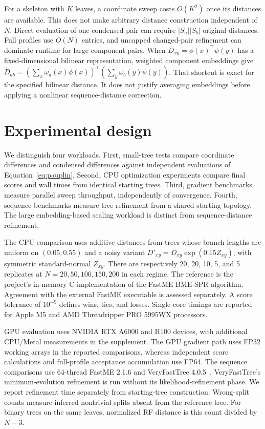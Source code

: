 \documentclass[11pt,a4paper]{article}
\makeatletter
\DeclareRobustCommand{\_}{\ifmmode\nfss@text{\textunderscore}\else\textunderscore\allowbreak\fi}
\theoremstyle{definition}
\makeatother
\begin{document}
For a skeleton with $K$ leaves, a coordinate sweep costs $O(K^2)$ once its distances are available.
This does not make arbitrary distance construction independent of $N$.
Direct evaluation of one condensed pair can require $|S_a||S_b|$ original distances.
Full profiles use $O(N)$ entries, and uncapped changed-pair refinement can dominate runtime for large component pairs.
When $D_{xy}=\phi(x)^\top\psi(y)$ has a fixed-dimensional bilinear representation, weighted component embeddings give
$\widetilde D_{ab}=(\sum_x\omega_a(x)\phi(x))^\top
(\sum_y\omega_b(y)\psi(y))$.
That shortcut is exact for the specified bilinear distance.
It does not justify averaging embeddings before applying a nonlinear sequence-distance correction.

\section{Experimental design}
\label{sec:experiments}

We distinguish four workloads.
First, small-tree tests compare coordinate differences and condensed differences against independent evaluations of Equation~\eqref{eq:pauplin}.
Second, CPU optimization experiments compare final scores and wall times from identical starting trees.
Third, gradient benchmarks measure parallel sweep throughput, independently of convergence.
Fourth, sequence benchmarks measure tree refinement from a shared starting topology.
The large embedding-based scaling workload is distinct from sequence-distance refinement.

The CPU comparison uses additive distances from trees whose branch lengths are uniform on $(0.05,0.55)$ and a noisy variant
$D'_{xy}=D_{xy}\exp(0.15Z_{xy})$, with symmetric standard-normal $Z_{xy}$.
There are respectively 20, 20, 10, 5, and 5 replicates at
$N=20,50,100,150,200$ in each regime.
The reference is the project's in-memory C implementation of the FastME BME-SPR algorithm.
Agreement with the external FastME executable is assessed separately.
A score tolerance of $10^{-9}$ defines wins, ties, and losses.
Single-core timings are reported for Apple M5 and AMD Threadripper PRO 5995WX processors.

GPU evaluation uses NVIDIA RTX A6000 and H100 devices, with additional CPU/Metal measurements in the supplement.
The GPU gradient path uses FP32 working arrays in the reported comparisons, whereas independent score calculations and full-profile acceptance accumulation use FP64.
The sequence comparisons use 64-thread FastME 2.1.6 and VeryFastTree 4.0.5~\cite{lefort2015fastme,pineiro2020veryfasttree}.
VeryFastTree's minimum-evolution refinement is run without its likelihood-refinement phase.
We report refinement time separately from starting-tree construction.
Wrong-split counts measure inferred nontrivial splits absent from the reference tree.
For binary trees on the same leaves, normalized RF distance is this count divided by $N-3$.
\end{document}
